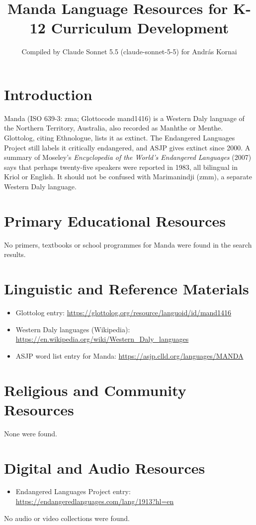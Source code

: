 \documentclass[12pt]{article}
\title{Manda Language Resources for K-12 Curriculum Development}
\author{Compiled by Claude Sonnet 5.5 (claude-sonnet-5-5) for Andr\'as Kornai}
\date{}
\begin{document}
\maketitle

\section{Introduction}
Manda (ISO 639-3: zma; Glottocode mand1416) is a Western Daly language of the Northern Territory, Australia, also recorded as Manhthe or Menthe. Glottolog, citing Ethnologue, lists it as extinct. The Endangered Languages Project still labels it critically endangered, and ASJP gives extinct since 2000. A summary of Moseley's \emph{Encyclopedia of the World's Endangered Languages} (2007) says that perhaps twenty-five speakers were reported in 1983, all bilingual in Kriol or English. It should not be confused with Marimanindji (zmm), a separate Western Daly language.

\section{Primary Educational Resources}
No primers, textbooks or school programmes for Manda were found in the search results.

\section{Linguistic and Reference Materials}
\begin{itemize}
\item Glottolog entry: \url{https://glottolog.org/resource/languoid/id/mand1416}
\item Western Daly languages (Wikipedia): \url{https://en.wikipedia.org/wiki/Western_Daly_languages}
\item ASJP word list entry for Manda: \url{https://asjp.clld.org/languages/MANDA}
\end{itemize}

\section{Religious and Community Resources}
None were found.

\section{Digital and Audio Resources}
\begin{itemize}
\item Endangered Languages Project entry: \url{https://endangeredlanguages.com/lang/1913?hl=en}
\end{itemize}
No audio or video collections were found.
\end{document}
